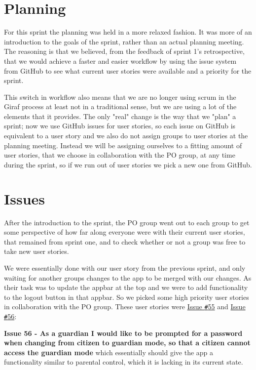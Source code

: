 \section{Planning}\label{sprint2Planning}
For this sprint the planning was held in a more relaxed fashion.
It was more of an introduction to the goals of the sprint, rather than an actual planning meeting.
The reasoning is that we believed, from the feedback of sprint 1's retrospective, that we would achieve a faster and easier workflow by using the issue system from GitHub to see what current user stories were available and a priority for the sprint.

This switch in workflow also means that we are no longer using scrum in the Giraf process at least not in a traditional sense, but we are using a lot of the elements that it provides.
The only "real" change is the way that we "plan" a sprint; now we use GitHub issues for user stories, so each issue on GitHub is equivalent to a user story and we also do not assign groups to user stories at the planning meeting.
Instead we will be assigning ourselves to a fitting amount of user stories, that we choose in collaboration with the PO group, at any time during the sprint, so if we run out of user stories we pick a new one from GitHub.

\section{Issues}\label{sprint2planstories}
After the introduction to the sprint, the PO group went out to each group to get some perspective of how far along everyone were with their current user stories, that remained from sprint one, and to check whether or not a group was free to take new user stories.

We were essentially done with our user story from the previous sprint, and only waiting for another groups changes to the app to be merged with our changes.
As their task was to update the appbar at the top and we were to add functionality to the logout button in that appbar.
So we picked some high priority user stories in collaboration with the PO group.
These user stories were \href{https://github.com/aau-giraf/wiki/issues/55}{Issue \texttt{\#}55} and \href{https://github.com/aau-giraf/wiki/issues/56}{Issue \texttt{\#}56}:

\textbf{Issue 56 - As a guardian I would like to be prompted for a password when changing from citizen to guardian mode, so that a citizen cannot access the guardian mode} which essentially should give the app a functionality similar to parental control, which it is lacking in its current state.

